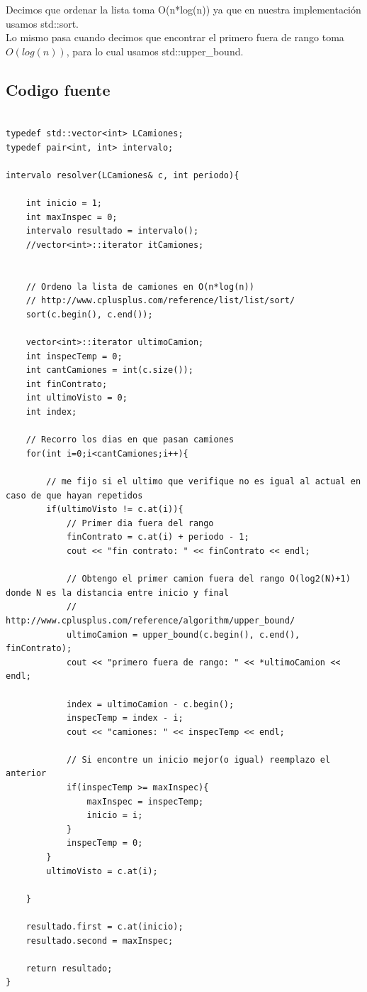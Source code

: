 Decimos que ordenar la lista toma O(n*log(n)) ya que en nuestra implementaci\'on usamos std::sort.\cite{sort}\\
Lo mismo pasa cuando decimos que encontrar el primero fuera de rango toma $O(log(n))$, para lo cual usamos std::upper\_bound.\cite{upper} \\

\newpage 

\subsection{Codigo fuente}

\begin{lstlisting}

typedef std::vector<int> LCamiones;
typedef pair<int, int> intervalo;

intervalo resolver(LCamiones& c, int periodo){
	
	int inicio = 1;
	int maxInspec = 0;
	intervalo resultado = intervalo();
	//vector<int>::iterator itCamiones;


	// Ordeno la lista de camiones en O(n*log(n))
	// http://www.cplusplus.com/reference/list/list/sort/
	sort(c.begin(), c.end());

	vector<int>::iterator ultimoCamion;
	int inspecTemp = 0;
	int cantCamiones = int(c.size());
	int finContrato;
	int ultimoVisto = 0;
	int index;

	// Recorro los dias en que pasan camiones
	for(int i=0;i<cantCamiones;i++){
		
		// me fijo si el ultimo que verifique no es igual al actual en caso de que hayan repetidos
		if(ultimoVisto != c.at(i)){
			// Primer dia fuera del rango
			finContrato = c.at(i) + periodo - 1;
			cout << "fin contrato: " << finContrato << endl;
			
			// Obtengo el primer camion fuera del rango O(log2(N)+1) donde N es la distancia entre inicio y final
			// http://www.cplusplus.com/reference/algorithm/upper_bound/
			ultimoCamion = upper_bound(c.begin(), c.end(), finContrato);
			cout << "primero fuera de rango: " << *ultimoCamion << endl;
			
			index = ultimoCamion - c.begin();
			inspecTemp = index - i;
			cout << "camiones: " << inspecTemp << endl;

			// Si encontre un inicio mejor(o igual) reemplazo el anterior
			if(inspecTemp >= maxInspec){
				maxInspec = inspecTemp;
				inicio = i;
			}
			inspecTemp = 0;
		}
		ultimoVisto = c.at(i);

	}

	resultado.first = c.at(inicio);
	resultado.second = maxInspec;
	
	return resultado;
}

\end{lstlisting}

